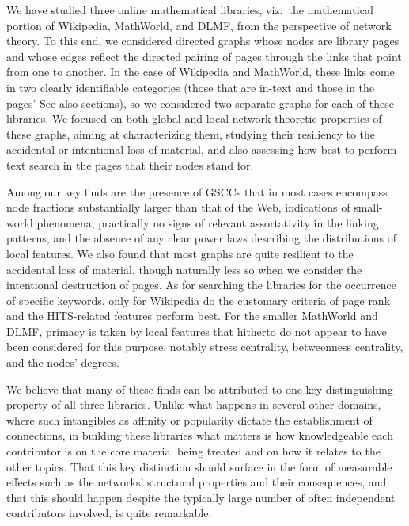 \documentclass{article}
\begin{document}
We have studied three online mathematical libraries, viz.\ the mathematical
portion of Wikipedia, MathWorld, and DLMF, from the perspective of network
theory. To this end, we considered directed graphs whose nodes are library pages
and whose edges reflect the directed pairing of pages through the links that
point from one to another. In the case of Wikipedia and MathWorld, these links
come in two clearly identifiable categories (those that are in-text and those in
the pages' See-also sections), so we considered two separate graphs for each of
these libraries. We focused on both global and local network-theoretic
properties of these graphs, aiming at characterizing them, studying their
resiliency to the accidental or intentional loss of material, and also assessing
how best to perform text search in the pages that their nodes stand for.

Among our key finds are the presence of GSCCs that in most cases encompass
node fractions substantially larger than that of the Web, indications of
small-world phenomena, practically no signs of relevant assortativity in the
linking patterns, and the absence of any clear power laws describing the
distributions of local features. We also found that most graphs are quite
resilient to the accidental loss of material, though naturally less so when we
consider the intentional destruction of pages. As for searching the libraries
for the occurrence of specific keywords, only for Wikipedia do the customary
criteria of page rank and the HITS-related features perform best. For the
smaller MathWorld and DLMF, primacy is taken by local features that hitherto do
not appear to have been considered for this purpose, notably stress centrality,
betweenness centrality, and the nodes' degrees.

We believe that many of these finds can be attributed to one key distinguishing
property of all three libraries. Unlike what happens in several other domains,
where such intangibles as affinity or popularity dictate the establishment of
connections, in building these libraries what matters is how knowledgeable each
contributor is on the core material being treated and on how it relates to the
other topics. That this key distinction should surface in the form of measurable
effects such as the networks' structural properties and their consequences, and
that this should happen despite the typically large number of often independent
contributors involved, is quite remarkable.
\end{document}
